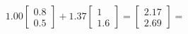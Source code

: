 \documentclass[preview]{standalone}
\begin{document}
\begin{align*}
1.00 \begin{bmatrix} 0.8 \\ 0.5 \end{bmatrix} + 1.37 \begin{bmatrix} 1 \\ 1.6 \end{bmatrix} = \begin{bmatrix} 2.17 \\ 2.69 \end{bmatrix} =
\end{align*}
\end{document}
